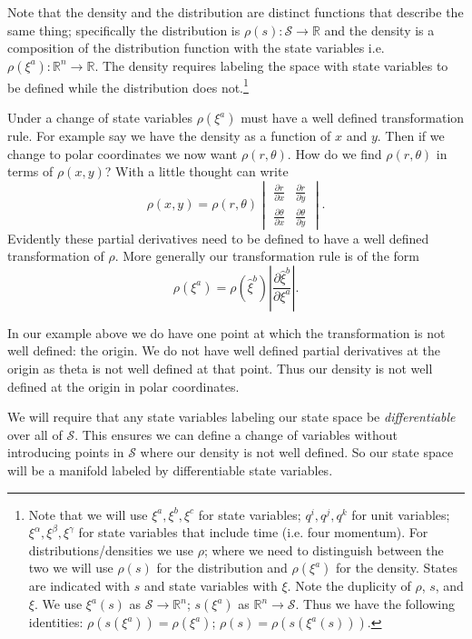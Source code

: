 \documentclass{article}[a4paper]
\begin{document}
	 Note that the density and the distribution are distinct functions that describe the same thing; specifically the distribution is $\rho(s) : \mathcal{S} \to \mathbb{R}$ and the density is a composition of the distribution function with the state variables i.e. $\rho(\xi^a) : \mathbb{R}^n \to \mathbb{R}$. The density requires labeling the space with state variables to be defined while the distribution does not.\footnote{Note that we will use $\xi^a, \xi^b, \xi^c$ for state variables; $q^i, q^j, q^k$ for unit variables; $\xi^\alpha, \xi^\beta, \xi^\gamma$ for state variables that include time (i.e. four momentum). For distributions/densities we use $\rho$; where we need to distinguish between the two we will use $\rho(s)$ for the distribution and $\rho(\xi^a)$ for the density. States are indicated with $s$ and state variables with $\xi$. Note the duplicity of $\rho$, $s$, and $\xi$. We use $\xi^a(s)$ as $\mathcal{S} \to \mathbb{R}^n$; $s(\xi^a)$ as $\mathbb{R}^n \to \mathcal{S}$.
Thus we have the following identities: $\rho(s(\xi^a)) = \rho(\xi^a)$; $\rho(s) = \rho(s (\xi^a(s)))$.}


	Under a change of state variables $\rho(\xi^a)$ must have a well defined transformation rule. For example say we have the density as a function of $x$ and $y$. Then if we change to polar coordinates we now want $\rho(r,\theta)$. How do we find $\rho(r,\theta)$ in terms of $\rho(x,y)$? With a little thought can write $$\rho(x,y) = \rho(r,\theta)\begin{vmatrix}
\frac{\partial r}{\partial x} & \frac{\partial r}{\partial y} \\
\frac{\partial \theta}{\partial x} & \frac{\partial \theta}{\partial y}
\end{vmatrix}.$$ Evidently these partial derivatives need to be defined to have a well defined transformation of $\rho$. More generally our transformation rule is of the form $$\rho(\xi^a) = \rho(\hat{\xi}^b)\left|\frac{\partial\hat{\xi}^b}{\partial\xi^a}\right|.$$

	In our example above we do have one point at which the transformation is not well defined: the origin. We do not have well defined partial derivatives at the origin as theta is not well defined at that point. Thus our density is not well defined at the origin in polar coordinates.
	
	We will require that any state variables labeling our state space be \textit{differentiable} over all of $\mathcal{S}$. This ensures we can define a change of variables without introducing points in $\mathcal{S}$ where our density is not well defined. So our state space will be a manifold labeled by differentiable state variables.
\end{document}
